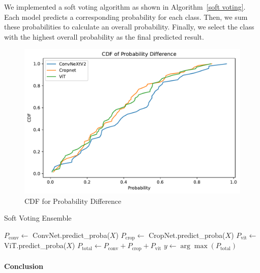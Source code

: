 We implemented a soft voting algorithm as shown in Algorithm~\ref{soft voting}. Each model predicts a corresponding probability for each class. Then, we sum these probabilities to calculate an overall probability. Finally, we select the class with the highest overall probability as the final predicted result.

\begin{figure}
    \centering
    \includegraphics[width=0.7\linewidth]{graphs/ModelMergeStudy/cdf}
    \caption{CDF for Probability Difference}
    \label{fig:cdf}
\end{figure}

\begin{algorithm}[ht]
\SetAlgoLined
{}
\caption{Soft Voting Ensemble}
\label{soft voting}
$P_{\text{conv}} \gets$ ConvNet.predict\_proba($X$) 
$P_{\text{crop}} \gets$ CropNet.predict\_proba($X$) 
$P_{\text{vit}} \gets$ ViT.predict\_proba($X$) 
$P_{\text{total}} \gets P_{\text{conv}} + P_{\text{crop}} + P_{\text{vit}}$
$y \gets \arg\max(P_{\text{total}})$ 


\end{algorithm}

\paragraph{Conclusion}

